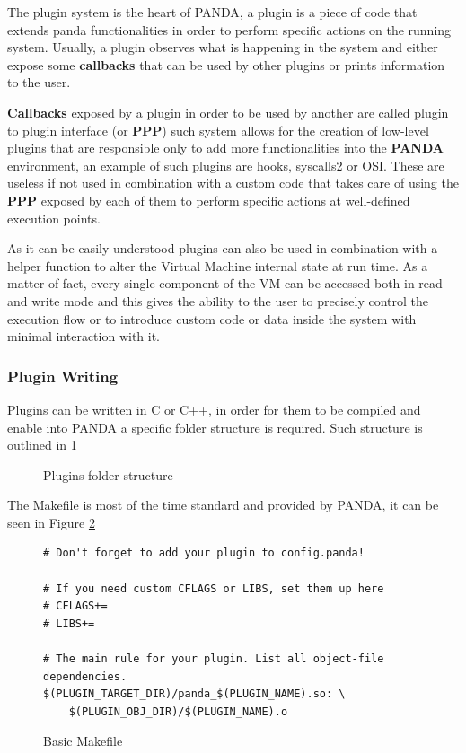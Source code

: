 The plugin system is the heart of PANDA, a plugin is a piece of code that extends panda functionalities in order to perform specific actions on the running system. Usually, a plugin observes what is happening in the system and either expose some \textbf{callbacks} that can be used by other plugins or prints information to the user.

\textbf{Callbacks} exposed by a plugin in order to be used by another are called plugin to plugin interface (or \textbf{PPP}) such system allows for the creation of low-level plugins that are responsible only to add more functionalities into the \textbf{PANDA} environment, an example of such plugins are hooks, syscalls2 or OSI. These are useless if not used in combination with a custom code that takes care of using the \textbf{PPP} exposed by each of them to perform specific actions at well-defined execution points.

As it can be easily understood plugins can also be used in combination with a helper function to alter the Virtual Machine internal state at run time. As a matter of fact, every single component of the VM can be accessed both in read and write mode and this gives the ability to the user to precisely control the execution flow or to introduce custom code or data inside the system with minimal interaction with it. 


\subsubsection{Plugin Writing}

Plugins can be written in C or C++, in order for them to be compiled and enable into PANDA a specific folder structure is required. Such structure is outlined in \ref{fig:plugs}

\begin{figure}[htp]
\centering
\begin{minipage}{\linewidth}
\end{minipage}
\caption{Plugins folder structure}
\label{fig:plugs}
\end{figure}

The Makefile is most of the time standard and provided by PANDA, it can be seen in Figure \ref{fig:mak}

\begin{figure}[htp]
\centering
\begin{minipage}{\linewidth}
\begin{lstlisting}
# Don't forget to add your plugin to config.panda!

# If you need custom CFLAGS or LIBS, set them up here
# CFLAGS+=
# LIBS+=

# The main rule for your plugin. List all object-file dependencies.
$(PLUGIN_TARGET_DIR)/panda_$(PLUGIN_NAME).so: \
	$(PLUGIN_OBJ_DIR)/$(PLUGIN_NAME).o
\end{lstlisting}
\end{minipage}
\caption{Basic Makefile}
\label{fig:mak}
\end{figure}


